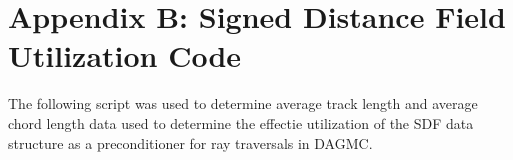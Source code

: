 
\chapter{Appendix B: Signed Distance Field Utilization Code}\label{ch:appendix-b}

The following script was used to determine average track length and average
chord length data used to determine the effectie utilization of the SDF data
structure as a preconditioner for ray traversals in DAGMC.

